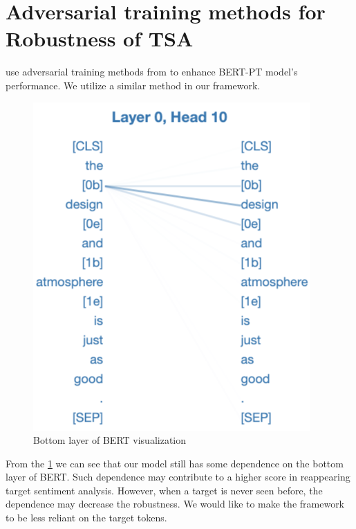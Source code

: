\documentclass[fyp]{socreport}
\begin{document}
\section{Adversarial training methods for Robustness of TSA}
\cite{karimi2020adversarial} use adversarial training methods from \cite{miyato2016adversarial} to enhance BERT-PT\cite{xu2019bert} model's performance. We utilize a similar method in our framework.

\begin{figure}[h]
    \centering
    \includegraphics[width=\linewidth]{./image/target-depence.png}
    \caption{Bottom layer of BERT visualization}
  \label{target-depence}
\end{figure}

From the \ref{target-depence} we can see that our model still has some dependence on the bottom layer of BERT. Such dependence may contribute to a higher score in reappearing target sentiment analysis. However, when a target is never seen before, the dependence may decrease the robustness. We would like to make the framework to be less reliant on the target tokens.
\end{document}
